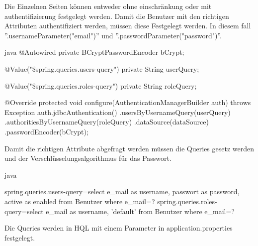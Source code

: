 Die Einzelnen Seiten können entweder ohne einschränkung oder mit authentifizierung festgelegt werden. Damit die Benutzer mit den richtigen Attributen authentifiziert werden, müssen diese Festgelegt werden. In diesem fall ''.usernameParameter("email")'' und ''.passwordParameter("password")''.

\begin{code}[]{java}
	@Autowired
	private BCryptPasswordEncoder bCrypt;
	
	 @Value("\${spring.queries.users-query}")
	private String userQuery;
	
	@Value("\${spring.queries.roles-query}")
	private String roleQuery;
	
	@Override
	protected void configure(AuthenticationManagerBuilder auth) throws Exception{
		auth.jdbcAuthentication()
		.usersByUsernameQuery(userQuery)
		.authoritiesByUsernameQuery(roleQuery)
		.dataSource(dataSource)
		.passwordEncoder(bCrypt);
	}
\end{code}

Damit die richtigen Attribute abgefragt werden müssen die Queries gesetz werden und der Verschlüsselungsalgorithmus für das Passwort.

\begin{code}[]{java}

	spring.queries.users-query=select e_mail as username, passwort as password, active as enabled from Benutzer where e_mail=?
	spring.queries.roles-query=select e_mail as username, 'default' from Benutzer where e_mail=?
	
\end{code}

Die Queries werden in HQL mit einem Parameter in application.properties festgelegt.